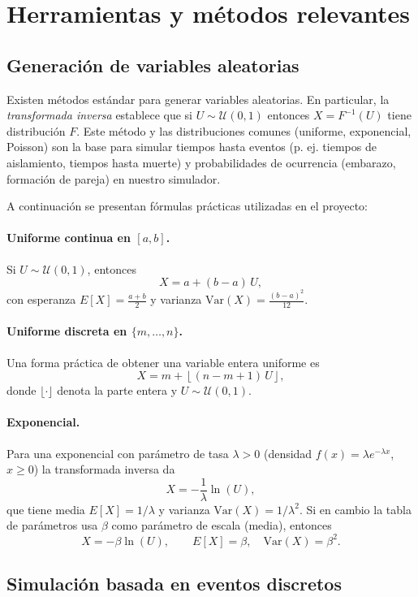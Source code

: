 \documentclass[12pt, a4paper, spanish]{report}
\begin{document}
\section{Herramientas y métodos relevantes}

\subsection{Generación de variables aleatorias}

Existen métodos estándar para generar variables aleatorias. En particular, la \emph{transformada inversa} establece que si $U\sim\mathcal{U}(0,1)$ entonces $X=F^{-1}(U)$ tiene distribución $F$. Este método y las distribuciones
comunes (uniforme, exponencial, Poisson) son la base para simular tiempos hasta
eventos (p. ej. tiempos de aislamiento, tiempos hasta muerte) y probabilidades
de ocurrencia (embarazo, formación de pareja) en nuestro simulador. 

A continuación se presentan fórmulas prácticas utilizadas en el proyecto:

\paragraph{Uniforme continua en $[a,b]$.}
Si $U\sim\mathcal{U}(0,1)$, entonces
$$
X = a + (b-a)\,U,
$$
con esperanza $E[X]=\frac{a+b}{2}$ y varianza $\mathrm{Var}(X)=\frac{(b-a)^2}{12}$.

\paragraph{Uniforme discreta en $\{m,\dots,n\}$.}
Una forma práctica de obtener una variable entera uniforme es
$$
X = m + \left\lfloor (n-m+1)\,U \right\rfloor,
$$
donde $\lfloor\cdot\rfloor$ denota la parte entera y $U\sim\mathcal{U}(0,1)$.

\paragraph{Exponencial.}
Para una exponencial con parámetro de tasa $\lambda>0$ (densidad $f(x)=\lambda e^{-\lambda x}$, $x\ge 0$) la transformada inversa da
$$
X = -\frac{1}{\lambda}\ln(U),
$$
que tiene media $E[X]=1/\lambda$ y varianza $\mathrm{Var}(X)=1/\lambda^2$.
Si en cambio la tabla de parámetros usa $\beta$ como parámetro de escala (media), entonces
$$
X = -\beta\ln(U), \qquad E[X]=\beta,\quad \mathrm{Var}(X)=\beta^2.
$$


\subsection{Simulación basada en eventos discretos}
\end{document}
